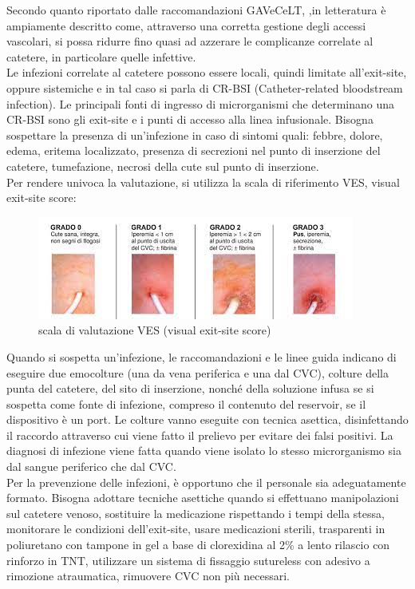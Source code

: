 Secondo quanto riportato dalle raccomandazioni GAVeCeLT, ,in letteratura è ampiamente descritto come, attraverso una 
corretta gestione degli accessi vascolari, si possa ridurre fino quasi ad azzerare le complicanze correlate al 
catetere, in particolare quelle infettive\cite{GAVECELTracc2021}.\\
Le infezioni correlate al catetere possono essere locali, quindi limitate all’exit-site, oppure sistemiche e in tal 
caso si parla di CR-BSI (Catheter-related bloodstream infection). Le principali fonti di ingresso di microrganismi 
che determinano una CR-BSI sono gli exit-site e i punti di accesso alla linea infusionale. 
Bisogna sospettare la presenza di un’infezione in caso di sintomi quali: febbre, dolore, edema, eritema localizzato, 
presenza di secrezioni nel punto di inserzione del catetere, tumefazione, necrosi della cute sul punto di inserzione\cite{AIOMCVC}.\\
Per rendere univoca la valutazione, si utilizza la scala di riferimento VES, visual exit-site score:

\begin{figure}[H]
    \begin{center}
    \includegraphics[width=0.7\columnwidth]{img/VES.jpeg}
    \end{center}
    \caption[Scala di valutazione VES (visual exit-site score)]{scala di valutazione VES (visual exit-site score)
    \cite{img51}}

\end{figure}

Quando si sospetta un’infezione, le raccomandazioni e le linee guida indicano di eseguire due emocolture 
(una da vena periferica e una dal CVC), colture della punta del catetere, del sito di inserzione, nonché della 
soluzione infusa se si sospetta come fonte di infezione, compreso il contenuto del reservoir, se il dispositivo è un 
port. Le colture vanno eseguite con tecnica asettica, disinfettando il raccordo attraverso cui viene fatto il 
prelievo per evitare dei falsi positivi. La diagnosi di infezione viene fatta quando viene isolato lo stesso 
microrganismo sia dal sangue periferico che dal CVC\cite{AIOMCVC}.\\
Per la prevenzione delle infezioni, è opportuno che il personale sia adeguatamente formato. Bisogna adottare tecniche 
asettiche quando si effettuano manipolazioni sul catetere venoso, sostituire la medicazione rispettando i tempi della 
stessa, monitorare le condizioni dell’exit-site, usare medicazioni sterili, trasparenti in poliuretano con tampone 
in gel a base di clorexidina al 2\% a lento rilascio con rinforzo in TNT, utilizzare un sistema di fissaggio 
sutureless con adesivo a rimozione atraumatica, rimuovere CVC non più necessari\cite{AIOMCVC}.\\

